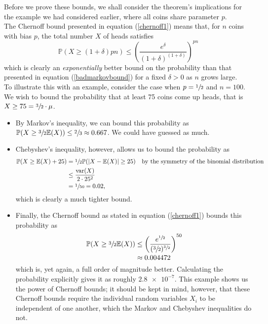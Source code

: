 	Before we prove these bounds, we shall consider the theorem's implications for the example 
	we had considered earlier, where all coins share parameter $p$. 
	\\
	The Chernoff bound presented in equation (\ref{chernoff1}) means that, for $n$ coins with 
	bias $p$, the total number $X$ of heads satisfies 
	$$
		\mathbb{P}(X \geq (1+\delta)pn) \leq
		\left(\frac{e^\delta}{(1+\delta)^{(1+\delta)}}\right)^{pn}
	$$
	which is clearly an \emph{exponentially} better bound on the probability than that 
	presented in equation (\ref{badmarkovbound}) for a fixed $\delta >0$ as $n$ grows large.
	\\
	To illustrate this with an example, consider the case when $p = \sfrac{1}{2}$ and $n=100$.
	We wish to bound the probability that at least 75 coins come up heads, that is $X \geq 75 =
	\sfrac{3}{2} \cdot \mu$. 
	\begin{itemize}
		\item By Markov's inequality, we can bound this probability as $\mathbb{P}(X \geq 
		\sfrac{3}{2} \mathbb{E}(X)) \leq \sfrac{2}{3} \approx 0.667$. We could have guessed
		as much.
		\item Chebyshev's inequality, however, allows us to bound the probability as 
		\begin{align*}
			\mathbb{P}(X \geq \mathbb{E}(X) + 25) &= 
			\sfrac{1}{2} \mathbb{P}(|X-\mathbb{E}(X)| \geq 25) & \text{by the symmetry 
			of the binomial distribution}\\
			&\leq \frac{\mathrm{var}(X)}{2 \cdot 25^2} \\
			&= \sfrac{1}{50} = 0.02,
		\end{align*}
		which is clearly a much tighter bound.
		\item Finally, the Chernoff bound as stated in equation (\ref{chernoff1}) bounds 
		this probability as 
		\begin{align*}
			\mathbb{P}(X \geq \sfrac{3}{2} \mathbb{E}(X)) &\leq 
			\left(\frac{e^{\sfrac{1}{2}}}{(\sfrac{3}{2})^{\sfrac{3}{2}}}\right)^{50} \\
			&\approx 0.004472
		\end{align*}
		which is, yet again, a full order of magnitude better. Calculating the probability 
		explicitly gives it as roughly $\num{2.8e-7}$. This example shows us the power of 
		Chernoff bounds; it should be kept in mind, however, that these Chernoff bounds 
		require the individual random variables $X_i$ to be independent of one another, 
		which the Markov and Chebyshev inequalities do not. 
	\end{itemize}

